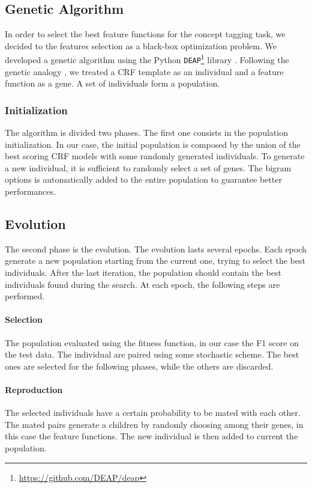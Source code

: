 \subsection{Genetic Algorithm}
\label{subsection:genetic}
In order to select the best feature functions for the concept tagging task, we decided to the features selection as a black-box optimization problem.
We developed a genetic algorithm using the Python \texttt{DEAP}\footnote{\url{https://github.com/DEAP/deap}} library \cite{deap}.
Following the genetic analogy \cite{lion}, we treated a \ac{CRF} template as an individual and a feature function as a gene.
A set of individuals form a population.

\subsubsection{Initialization}
The algorithm is divided two phases.
The first one consists in the population initialization.
In our case, the initial population is composed by the union of the best scoring \ac{CRF} models with some randomly generated individuals.
To generate a new individual, it is sufficient to randomly select a set of genes.
The bigram options is automatically added to the entire population to guarantee better performances.

\subsection{Evolution}
The second phase is the evolution.
The evolution lasts several epochs.
Each epoch generate a new population starting from the current one, trying to select the best individuals.
After the last iteration, the population should contain the best individuals found during the search.
At each epoch, the following steps are performed.

\paragraph{Selection}
The population evaluated using the fitness function, in our case the F1 score on the test data.
The individual are paired using some stochastic scheme.
The best ones are selected for the following phases, while the others are discarded.

\paragraph{Reproduction}
The selected individuals have a certain probability to be mated with each other.
The mated pairs generate a children by randomly choosing among their genes, in this case the feature functions.
The new individual is then added to current the population.

